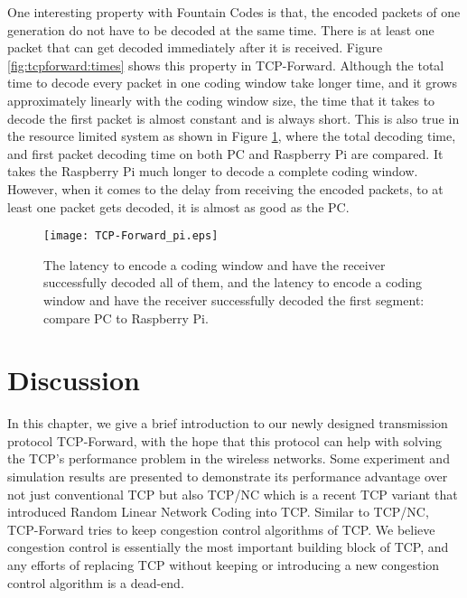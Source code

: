 \documentclass[10pt, conference, final, letterpaper]{IEEEtran}
\theoremstyle{definition}
\begin{document}
One interesting property with Fountain Codes is that, the encoded packets of one generation do not have to be decoded at the same time. There is at least one packet that can get decoded immediately after it is received. Figure \ref{fig:tcpforward:times} shows this property in TCP-Forward. Although the total time to decode every packet in one coding window take longer time, and it grows approximately linearly with the coding window size, the time that it takes to decode the first packet is almost constant and is always short. This is also true in the resource limited system as shown in Figure \ref{fig:tcpforward:pi}, where the total decoding time, and first packet decoding time on both PC and Raspberry Pi are compared. It takes the Raspberry Pi much longer to decode a complete coding window. However, when it comes to the delay from receiving the encoded packets, to at least one packet gets decoded, it is almost as good as the PC.

\begin{figure}[hbt]
	\begin{center}
		\texttt{[image: TCP-Forward\_pi.eps]}
	\end{center}
	\caption{The latency to encode a coding window and have the receiver successfully decoded all of them, and the latency to encode a coding window and have the receiver successfully decoded the first segment: compare PC to Raspberry Pi.}
	\label{fig:tcpforward:pi}
\end{figure}

\section{Discussion}

In this chapter, we give a brief introduction to our newly designed transmission protocol TCP-Forward, with the hope that this protocol can help with solving the TCP's performance problem in the wireless networks. Some experiment and simulation results are presented to demonstrate its performance advantage over not just conventional TCP but also TCP/NC which is a recent TCP variant that introduced Random Linear Network Coding into TCP. Similar to TCP/NC, TCP-Forward tries to keep congestion control algorithms of TCP. We believe congestion control is essentially the most important building block of TCP, and any efforts of replacing TCP without keeping or introducing a new congestion control algorithm is a dead-end.
\end{document}
